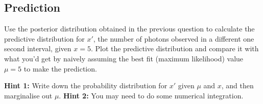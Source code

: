 \documentclass[a4paper, 11pt]{article}
\begin{document}
\subsection{Prediction}
Use the posterior distribution obtained in the previous question to calculate
the predictive distribution for $x'$, the number of photons observed in a
different one second interval, given $x=5$. Plot the predictive distribution
and compare it with what you'd get by naively assuming the best fit
(maximum likelihood) value $\mu=5$ to make the prediction.

{\bf Hint 1: }Write down the probability distribution for $x'$ given
$\mu$ and $x$, and then marginalise out $\mu$.
{\bf Hint 2: }You may need to do some numerical integration.
\end{document}
